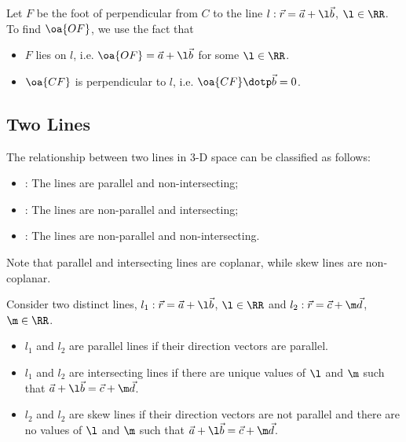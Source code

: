 \begin{method}
    Let $F$ be the foot of perpendicular from $C$ to the line $l : \vec r = \vec a + \l \vec b$, $\l \in \RR$. To find $\oa{OF}$, we use the fact that
    \begin{itemize}
        \item $F$ lies on $l$, i.e. $\oa{OF} = \vec a + \l \vec b$ for some $\l \in \RR$.
        \item $\oa{CF}$ is perpendicular to $l$, i.e. $\oa{CF} \dotp \vec b = 0$.
    \end{itemize}
\end{method}

\subsection{Two Lines}

\begin{definition}
    The relationship between two lines in 3-D space can be classified as follows:
    \begin{itemize}
        \item {}: The lines are parallel and non-intersecting;
        \item {}: The lines are non-parallel and intersecting;
        \item {}: The lines are non-parallel and non-intersecting.
    \end{itemize}
\end{definition}
\begin{remark}
    Note that parallel and intersecting lines are coplanar, while skew lines are non-coplanar.
\end{remark}

\begin{method}
    Consider two distinct lines, $l_1 : \vec r = \vec a + \l \vec b$, $\l \in \RR$ and $l_2 : \vec r = \vec c + \m \vec d$, $\m \in \RR$.
    \begin{itemize}
        \item $l_1$ and $l_2$ are parallel lines if their direction vectors are parallel.
        \item $l_1$ and $l_2$ are intersecting lines if there are unique values of $\l$ and $\m$ such that $\vec a + \l \vec b = \vec c + \m \vec d$.
        \item $l_2$ and $l_2$ are skew lines if their direction vectors are not parallel and there are no values of $\l$ and $\m$ such that $\vec a + \l \vec b = \vec c + \m \vec d$.
    \end{itemize}
\end{method}


